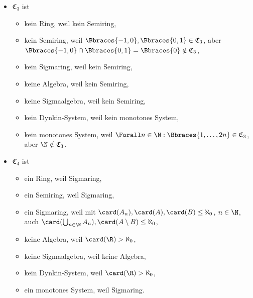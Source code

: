 \begin{solution}
\begin{itemize}
  \item $\mathfrak{C}_3$ ist
  \begin{itemize}
    \item kein Ring, weil kein Semiring,
    \item kein Semiring, weil $\Bbraces{-1, 0}, \Bbraces{0, 1} \in \mathfrak{C}_3$, aber $\Bbraces{-1, 0} \cap \Bbraces{0, 1} = \Bbraces{0} \notin \mathfrak{C}_3$,
    \item kein Sigmaring, weil kein Semiring,
    \item keine Algebra, weil kein Semiring,
    \item keine Sigmaalgebra, weil kein Semiring,
    \item kein Dynkin-System, weil kein monotones System,
    \item kein monotones System, weil $\Forall n \in \N: \Bbraces{1, \ldots, 2n} \in \mathfrak{C}_3$, aber $\N \notin \mathfrak{C}_3$.
  \end{itemize}

  \item $\mathfrak{C}_4$ ist
  \begin{itemize}
    \item ein Ring, weil Sigmaring,
    \item ein Semiring, weil Sigmaring,
    \item ein Sigmaring, weil mit $\card(A_n), \card(A), \card(B) \leq \aleph_0$, $n \in \N$, auch $\card(\bigcup_{n \in \N} A_n), \card(A \setminus B) \leq \aleph_0$,
    \item keine Algebra, weil $\card(\R) > \aleph_0$,
    \item keine Sigmaalgebra, weil keine Algebra,
    \item kein Dynkin-System, weil $\card(\R) > \aleph_0$,
    \item ein monotones System, weil Sigmaring.
  \end{itemize}

\end{itemize}

\end{solution}

